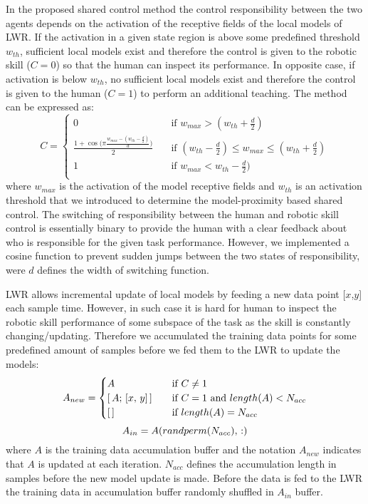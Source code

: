 In the proposed shared control method the control responsibility between the two agents depends on the activation of the receptive fields of the local models of LWR. If the activation in a given state region is above some predefined threshold $w_{th}$, sufficient local models exist and therefore the control is given to the robotic skill ($C=0$) so that the human can inspect its performance. In opposite case, if activation is below $w_{th}$, no sufficient local models exist and therefore the control is given to the human ($C=1$) to perform an additional teaching. The method can be expressed as:
\begin{equation}
C = \begin{cases} 0 & \quad \text{if } w_{max} > (w_{th} + \frac{d}{2})
\\ \frac{ 1 + \cos \big(\pi \frac{w_{max} - (w_{th} - \frac{d}{2}) }{d}\big)}{2}  & \quad \text{if } (w_{th} - \frac{d}{2}) \leq w_{max} \leq (w_{th} + \frac{d}{2})
\\ 1 & \quad \text{if } w_{max} < w_{th} - \frac{d}{2}) \\ \end{cases}
\label{eq:factor}
\end{equation}
where $w_{max}$ is the activation of the model receptive fields \cite{Schaal1998} and $w_{th}$ is an activation threshold that we introduced to determine the model-proximity based shared control. The switching of responsibility between the human and robotic skill control is essentially binary to provide the human with a clear feedback about who is responsible for the given task performance. However, we implemented a cosine function to prevent sudden jumps between the two states of responsibility, were $d$ defines the width of switching function.

LWR allows incremental update of local models by feeding a new data point [$x$,$y$] each sample time. However, in such case it is hard for human to inspect the robotic skill performance of some subspace of the task as the skill is constantly changing/updating. Therefore we accumulated the training data points for some predefined amount of samples before we fed them to the LWR to update the models:
\begin{equation}
A_{new} = \begin{cases} A & \quad \text{if } C \neq 1
\\ [\thinspace A; \thinspace [x, \thinspace y]\thinspace ] & \quad \text{if } C = 1 \text{ and } length(A) < N_{acc}
\\ [\thinspace] & \quad \text{if } length(A) = N_{acc} \\ \end{cases}
\label{eq:accumulate}
\end{equation}
\begin{equation}
A_{in} = A(randperm(N_{acc}),\thinspace :)
\label{eq:shuffle}
\end{equation}
where $A$ is the training data accumulation buffer and the notation $A_{new}$ indicates that $A$ is updated at each iteration. $N_{acc}$ defines the accumulation length in samples before the new model update is made.  Before the data is fed to the LWR the training data in accumulation buffer randomly shuffled in $A_{in}$ buffer.


